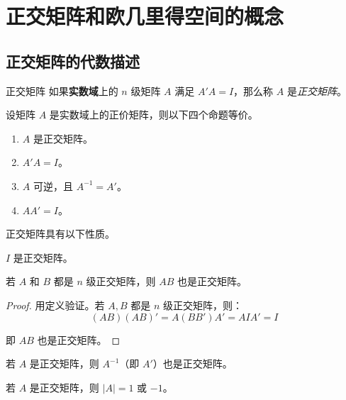 
\section{正交矩阵和欧几里得空间的概念}

\subsection{正交矩阵的代数描述}

\begin{definition}{正交矩阵}
	如果\textbf{实数域}上的 $n$ 级矩阵 $A$ 满足 $A'A= I$，那么称 $A$ 是\emph{正交矩阵}。
\end{definition}

\begin{theorem}[正交矩阵的等价命题]
	设矩阵 $A$ 是实数域上的正价矩阵，则以下四个命题等价。
	\begin{enumerate}
		\item $A$ 是正交矩阵。
		\item $A'A = I$。
		\item $A$ 可逆，且 $A^{-1} = A'$。
		\item $AA' = I$。
	\end{enumerate}
\end{theorem}

正交矩阵具有以下性质。

\begin{theorem}
	$I$ 是正交矩阵。
\end{theorem}

\begin{theorem}
	若 $A$ 和 $B$ 都是 $n$ 级正交矩阵，则 $AB$ 也是正交矩阵。
\end{theorem}

\begin{proof}
	用定义验证。若 $A, B$ 都是 $n$ 级正交矩阵，则：
	$$
	(AB)(AB)' = A(BB')A' = AIA' = I
	$$

	即 $AB$ 也是正交矩阵。
\end{proof}

\begin{theorem}
	若 $A$ 是正交矩阵，则 $A^{-1}$（即 $A'$）也是正交矩阵。
\end{theorem}

\begin{theorem}
	若 $A$ 是正交矩阵，则 $|A| = 1$ 或 $-1$。
\end{theorem}

